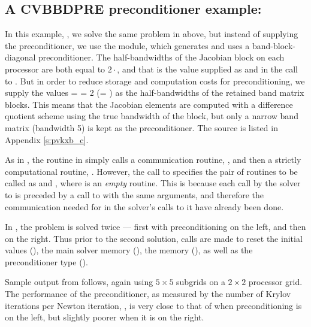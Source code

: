 

\subsection{A CVBBDPRE preconditioner example: }\label{ss:pvkxb}

In this example, , we solve the same problem in  above,
but instead of supplying the preconditioner, we use the {\cvbbdpre} module,
which generates and uses a band-block-diagonal preconditioner.  The
half-bandwidths of the Jacobian block on each processor are both equal to
$2\cdot$, and that is the value supplied as  and 
in the call to .  But in order to reduce storage and computation
costs for preconditioning, we supply the values  =  = 2
(= ) as the half-bandwidths of the retained band matrix blocks.
This means that the Jacobian elements are computed with a difference quotient
scheme using the true bandwidth of the block, but only a narrow band matrix
(bandwidth 5) is kept as the preconditioner.  The source is listed in
Appendix \ref{s:pvkxb_c}. 

As in , the  routine in  simply calls a communication
routine, , and then a strictly computational routine, .  
However, the call to  specifies the pair of routines to
be called as  and , where  is an {\em empty} routine.
This is because each call by the solver to  is preceded by a call
to  with the same  arguments, and therefore the communication
needed for  in the solver's calls to it have already been done.

In , the problem is solved twice --- first with preconditioning
on the left, and then on the right.  Thus prior to the second solution, calls
are made to reset the initial values (), the main solver
memory (), the {\cvbbdpre} memory (),
as well as the preconditioner type ().

Sample output from  follows, again using $5 \times 5$ subgrids 
on a $2 \times 2$ processor grid.  The performance of the preconditioner,
as measured by the number of Krylov iterations per Newton iteration,
, is very close to that of  when preconditioning is on
the left, but slightly poorer when it is on the right.


